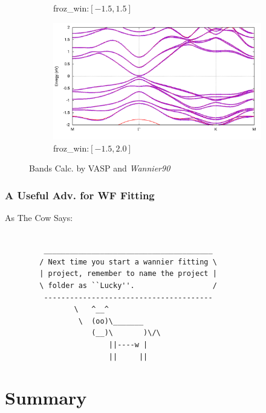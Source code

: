 \documentclass{beamer}
\begin{document}
\begin{frame}
\begin{figure}
\begin{subfigure}{0.42\textwidth}
         \caption{{\small froz\_win:\([-1.5,1.5]\)}}
      \end{subfigure}
      \begin{subfigure}{0.42\textwidth}
         \centering
         \includegraphics[width=\textwidth]{figure/Band_-1-5_to_2-0.png}
         \caption{{\small froz\_win:\([-1.5,2.0]\)}}
      \end{subfigure}
        \caption{Bands Calc. by VASP and \emph{Wannier90}}
    \end{figure}

  \end{frame}

  \begin{frame}[fragile]
    \frametitle{A Useful Adv. for WF Fitting}
    \begin{block}{As The Cow Says:}
      \begin{verbatim}

         _______________________________________
        / Next time you start a wannier fitting \
        | project, remember to name the project |
        \ folder as ``Lucky''.                  /
         ---------------------------------------
                \   ^__^
                 \  (oo)\_______
                    (__)\       )\/\
                        ||----w |
                        ||     ||
     \end{verbatim}
    \end{block}
  \end{frame}

  \section{Summary}
\end{document}
